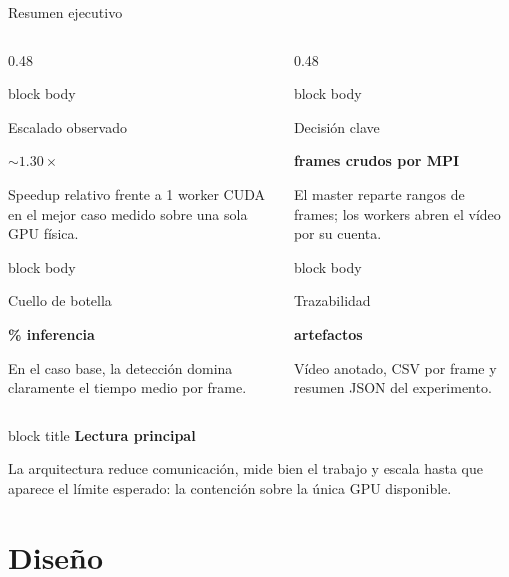 \documentclass[aspectratio=169,11pt]{beamer}
\newcommand{\metriccard}[3]{
  \begin{beamercolorbox}[wd=\linewidth,sep=0.65em,rounded=true,shadow=false]{block body}
    {\small\color{GraphGray}#1\par}
    \vspace{0.1em}
    {\bfseries\fontsize{16}{18}\selectfont #2\par}
    \vspace{0.1em}
    {\footnotesize #3\par}
  \end{beamercolorbox}
}
\newcommand{\callout}[2]{
  \begin{beamercolorbox}[wd=\linewidth,sep=0.6em,rounded=true,shadow=false]{block title}
    {\bfseries #1}\par
    \vspace{0.15em}
    {\footnotesize #2}
  \end{beamercolorbox}
}
\begin{document}
\begin{frame}{Resumen ejecutivo}
  \begin{columns}[T,totalwidth=\textwidth]
    \begin{column}{0.48\textwidth}
      \metriccard{Escalado observado}{\(\sim 1.30\times\)}{Speedup relativo frente a 1 worker CUDA en el mejor caso medido sobre una sola GPU física.}
      \vspace{0.25em}
      \metriccard{Cuello de botella}{70.4\% inferencia}{En el caso base, la detección domina claramente el tiempo medio por frame.}
    \end{column}
    \begin{column}{0.48\textwidth}
      \metriccard{Decisión clave}{0 frames crudos por MPI}{El master reparte rangos de frames; los workers abren el vídeo por su cuenta.}
      \vspace{0.25em}
      \metriccard{Trazabilidad}{3 artefactos}{Vídeo anotado, CSV por frame y resumen JSON del experimento.}
    \end{column}
  \end{columns}

  \vspace{0.35em}
  \callout{Lectura principal}{
    La arquitectura reduce comunicación, mide bien el trabajo y escala hasta que aparece el límite esperado: la contención sobre la única GPU disponible.}
\end{frame}

\section{Diseño}
\end{document}
